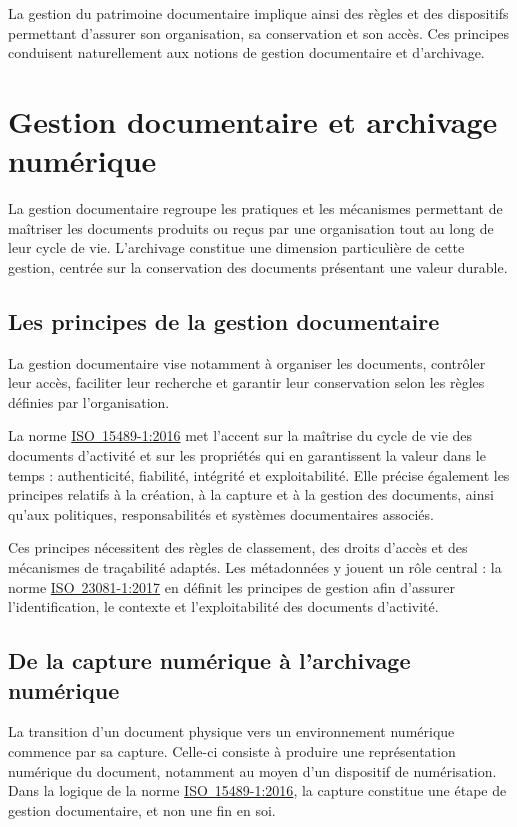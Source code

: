\documentclass[12pt,a4paper]{report}
\newcommand{\citer}[2]{\hyperref[ref:#1]{#2}}
\begin{document}
La gestion du patrimoine documentaire implique ainsi des règles et des dispositifs permettant d'assurer son organisation, sa conservation et son accès. Ces principes conduisent naturellement aux notions de gestion documentaire et d'archivage.

\section{Gestion documentaire et archivage numérique}
La gestion documentaire regroupe les pratiques et les mécanismes permettant de maîtriser les documents produits ou reçus par une organisation tout au long de leur cycle de vie. L'archivage constitue une dimension particulière de cette gestion, centrée sur la conservation des documents présentant une valeur durable.

\subsection{Les principes de la gestion documentaire}
La gestion documentaire vise notamment à organiser les documents, contrôler leur accès, faciliter leur recherche et garantir leur conservation selon les règles définies par l'organisation.

La norme \citer{iso15489}{\mbox{ISO 15489-1:2016}} met l'accent sur la maîtrise du cycle de vie des documents d'activité et sur les propriétés qui en garantissent la valeur dans le temps : authenticité, fiabilité, intégrité et exploitabilité. Elle précise également les principes relatifs à la création, à la capture et à la gestion des documents, ainsi qu'aux politiques, responsabilités et systèmes documentaires associés.

Ces principes nécessitent des règles de classement, des droits d'accès et des mécanismes de traçabilité adaptés. Les métadonnées y jouent un rôle central : la norme \citer{iso23081}{\mbox{ISO 23081-1:2017}} en définit les principes de gestion afin d'assurer l'identification, le contexte et l'exploitabilité des documents d'activité.

\subsection{De la capture numérique à l'archivage numérique}
La transition d'un document physique vers un environnement numérique commence par sa capture. Celle-ci consiste à produire une représentation numérique du document, notamment au moyen d'un dispositif de numérisation. Dans la logique de la norme \citer{iso15489}{\mbox{ISO 15489-1:2016}}, la capture constitue une étape de gestion documentaire, et non une fin en soi.
\end{document}
